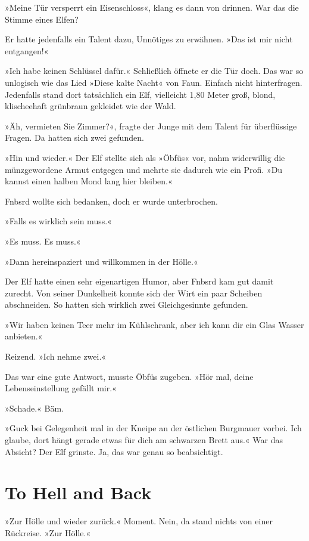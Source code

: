 »Meine Tür versperrt ein Eisenschloss«, klang es dann von drinnen. War das die Stimme eines Elfen?

Er hatte jedenfalls ein Talent dazu, Unnötiges zu erwähnen. »Das ist mir nicht entgangen!«

»Ich habe keinen Schlüssel dafür.« Schließlich öffnete er die Tür doch. Das war so unlogisch wie das Lied »Diese kalte Nacht« von Faun. Einfach nicht hinterfragen. Jedenfalls stand dort tatsächlich ein Elf, vielleicht 1,80 Meter groß, blond, klischeehaft grünbraun gekleidet wie der Wald.

»Äh, vermieten Sie Zimmer?«, fragte der Junge mit dem Talent für überflüssige Fragen. Da hatten sich zwei gefunden.

»Hin und wieder.« Der Elf stellte sich als »Öbfüs« vor, nahm widerwillig die münzgewordene Armut entgegen und mehrte sie dadurch wie ein Profi. »Du kannst einen halben Mond lang hier bleiben.«

Fnbsrd wollte sich bedanken, doch er wurde unterbrochen.

»Falls es wirklich sein muss.«

 »Es muss. Es muss.«

»Dann hereinspaziert und willkommen in der Hölle.«

Der Elf hatte einen sehr eigenartigen Humor, aber Fnbsrd kam gut damit zurecht. Von seiner Dunkelheit konnte sich der Wirt ein paar Scheiben abschneiden. So hatten sich wirklich zwei Gleichgesinnte gefunden.

»Wir haben keinen Teer mehr im Kühlschrank, aber ich kann dir ein Glas Wasser anbieten.«

Reizend. »Ich nehme zwei.«

Das war eine gute Antwort, musste Öbfüs zugeben. »Hör mal, deine Lebenseinstellung gefällt mir.«

»Schade.« Bäm.

»Guck bei Gelegenheit mal in der Kneipe an der östlichen Burgmauer vorbei. Ich glaube, dort hängt gerade etwas für dich am schwarzen Brett aus.« War das Absicht? Der Elf grinste. Ja, das war genau so beabsichtigt.


\chapter{To Hell and Back}

»Zur Hölle und wieder zurück.« Moment. Nein, da stand nichts von einer Rückreise. »Zur Hölle.«

